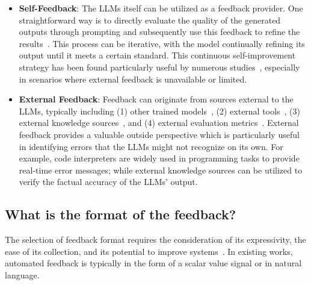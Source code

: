 \documentclass[a4paper,oneside]{book}
\begin{document}
\begin{itemize}
    \item \textbf{Self-Feedback}: The LLMs itself can be utilized as a feedback provider. One straightforward way is to directly evaluate the quality of the generated outputs through prompting and subsequently use this feedback to refine the results~\cite{madaan2023selfrefine, shinn2023reflexion}. This process can be iterative, with the model continually refining its output until it meets a certain standard. This continuous self-improvement strategy has been found particularly useful by numerous studies~\cite{selfee2023, yan-etal-2023-learning}, especially in scenarios where external feedback is unavailable or limited.

    \item \textbf{External Feedback}: Feedback can originate from sources external to the LLMs, typically including (1) other trained models~\cite{yan-etal-2023-learning, lightman2023lets}, (2) external tools~\cite{gou2023critic, charalambous2023new}, (3) external knowledge sources~\cite{gao2023rarr, yu2023improving}, and (4) external evaluation metrics~\cite{jung-etal-2022-maieutic, welleck2022generating}. External feedback provides a valuable outside perspective which is particularly useful in identifying errors that the LLMs might not recognize on its own. For example, code interpreters are widely used in programming tasks to provide real-time error messages; while external knowledge sources can be utilized to verify the factual accuracy of the LLMs' output.
\end{itemize}

\subsection{What is the format of the feedback?}
The selection of feedback format requires the consideration of its expressivity, the ease of its collection, and its potential to improve systems~\cite{fernandes2023bridging}. In existing works, automated feedback is typically in the form of a scalar value signal or in natural language.
\end{document}
